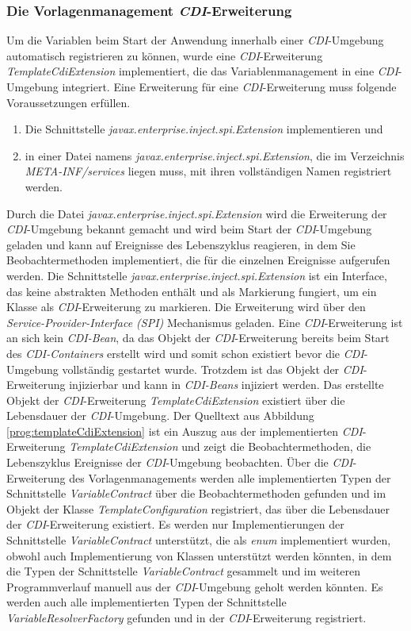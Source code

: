 \subsubsection{Die Vorlagenmanagement \emph{CDI}-Erweiterung}
Um die Variablen beim Start der Anwendung innerhalb einer \emph{CDI}-Umgebung automatisch registrieren zu können, wurde eine \emph{CDI}-Erweiterung \emph{TemplateCdiExtension} implementiert, die das Variablenmanagement in eine \emph{CDI}-Umgebung integriert. Eine Erweiterung für eine \emph{CDI}-Erweiterung muss folgende Voraussetzungen erfüllen. 
\begin{enumerate}
	\item Die Schnittstelle \emph{javax.enterprise.inject.spi.Extension} implementieren und
	\item in einer Datei namens \emph{javax.enterprise.inject.spi.Extension}, die im Verzeichnis \emph{META-INF/services} liegen muss, mit ihren vollständigen Namen registriert werden.
\end{enumerate}
Durch die Datei \emph{javax.enterprise.inject.spi.Extension} wird die Erweiterung der \emph{CDI}-Umgebung bekannt gemacht und wird beim Start der \emph{CDI}-Umgebung geladen und kann auf Ereignisse des Lebenszyklus reagieren, in dem Sie Beobachtermethoden implementiert, die für die einzelnen Ereignisse aufgerufen werden. Die Schnittstelle \emph{javax.enterprise.inject.spi.Extension} ist ein Interface, das keine abstrakten Methoden enthält und als Markierung fungiert, um ein Klasse als \emph{CDI}-Erweiterung zu markieren. Die Erweiterung wird über den \emph{Service-Provider-Interface (SPI)} Mechanismus geladen.
\newline
\newline
Eine \emph{CDI}-Erweiterung ist an sich kein \emph{CDI-Bean}, da das Objekt der \emph{CDI}-Erweiterung bereits beim Start des \emph{CDI-Containers} erstellt wird und somit schon existiert bevor die \emph{CDI}-Umgebung vollständig gestartet wurde. Trotzdem ist das Objekt der \emph{CDI}-Erweiterung injizierbar und kann in \emph{CDI-Beans} injiziert werden. Das erstellte Objekt der \emph{CDI}-Erweiterung \emph{TemplateCdiExtension} existiert über die Lebensdauer der \emph{CDI}-Umgebung.
\newline
\newline
Der Quelltext aus Abbildung \ref{prog:templateCdiExtension} ist ein Auszug aus der implementierten \emph{CDI}-Erweiterung \emph{TemplateCdiExtension} und zeigt die Beobachtermethoden, die Lebenszyklus Ereignisse der \emph{CDI}-Umgebung beobachten. Über die \emph{CDI}-Erweiterung des Vorlagenmanagements werden alle implementierten Typen der Schnittstelle \emph{VariableContract} über die Beobachtermethoden gefunden und im Objekt der Klasse \emph{TemplateConfiguration} registriert, das über die Lebensdauer der \emph{CDI}-Erweiterung existiert. Es werden nur Implementierungen der Schnittstelle \emph{VariableContract} unterstützt, die als \emph{enum} implementiert wurden, obwohl auch Implementierung von Klassen unterstützt werden könnten, in dem die Typen der Schnittstelle \emph{VariableContract} gesammelt und im weiteren Programmverlauf  manuell aus der \emph{CDI}-Umgebung geholt werden könnten. Es werden auch alle implementierten Typen der Schnittstelle \emph{VariableResolverFactory} gefunden und in der \emph{CDI}-Erweiterung registriert.
